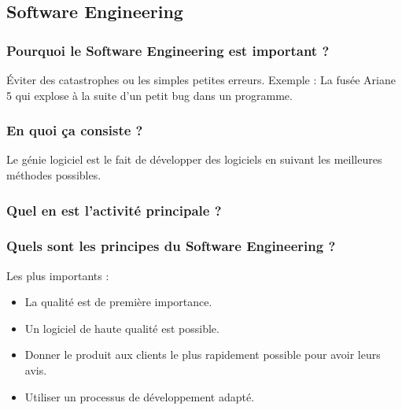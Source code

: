 \subsection{Software Engineering}

\subsubsection{Pourquoi le Software Engineering est important ?}
Éviter des catastrophes ou les simples petites erreurs. Exemple : La fusée Ariane 5 qui explose à la suite d'un petit bug dans un programme.
\subsubsection{En quoi ça consiste ?}
Le génie logiciel est le fait de développer des logiciels en suivant les meilleures méthodes possibles.
\subsubsection{Quel en est l'activité principale ?}
\subsubsection{Quels sont les principes du Software Engineering ?}
Les plus importants :
\begin{itemize}
   \item La qualité est de première importance.
   \item Un logiciel de haute qualité est possible.
   \item Donner le produit aux clients le plus rapidement possible pour avoir leurs avis.
   \item Utiliser un processus de développement adapté.
\end{itemize}

